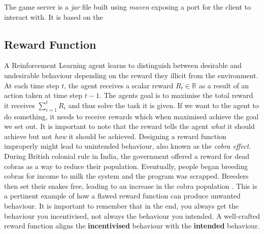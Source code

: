 \documentclass[notitlepage,a4paper,11pt]{article}
\newcommand{\R}{\mathbb{R}}
\begin{document}
The game server is a \textit{jar} file built using \textit{maven} exposing a port for the client to interact with. It is based on the 


\subsection{Reward Function} \label{reward_function}

A Reinforcement Learning agent learns to distinguish between desirable and undesirable behaviour depending on the reward they illicit from the environment. At each time step $t$, the agent receives a scalar reward $R_t \in \R$ as a result of an action taken at time step $t-1$. The agents goal is to maximise the total reward it receives $\sum^{t}_{i=1} R_i$ and thus solve the task it is given. If we want to the agent to do something, it needs to receive rewards which when maximised achieve the goal we set out. It is important to note that the reward tells the agent \textit{what} it should achieve but not \textit{how} it should be achieved. Designing a reward function improperly might lead to unintended behaviour, also known as the \textit{cobra effect}. During British colonial rule in India, the government offered a reward for dead cobras as a way to reduce their population. Eventually, people began breeding cobras for income to milk the system and the program was scrapped. Breeders then set their snakes free, leading to an increase in the cobra population \cite{siebert2001kobra}. This is a pertinent example of how a flawed reward function can produce unwanted behaviour. It is important to remember that in the end, you always get the behaviour you incentivised, not always the behaviour you intended. A well-crafted reward function aligns the \textbf{incentivised} behaviour with the \textbf{intended} behaviour.
\end{document}
